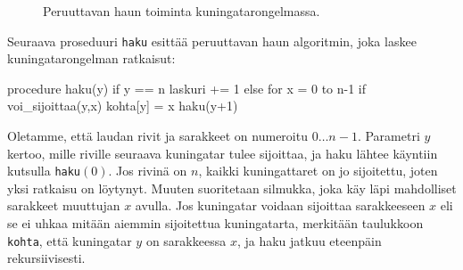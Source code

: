 \begin{figure}
\center
{}
\caption{Peruuttavan haun toiminta kuningatarongelmassa.}
\label{fig:hakupuu}
\end{figure}


Seuraava proseduuri \texttt{haku} esittää peruuttavan haun algoritmin,
joka laskee kuningatarongelman ratkaisut:

\begin{code}
procedure haku(y)
    if y == n
        laskuri += 1
    else
        for x = 0 to n-1
            if voi_sijoittaa(y,x)
                kohta[y] = x
                haku(y+1)
\end{code}

Oletamme, että laudan rivit ja sarakkeet on numeroitu $0 \dots n-1$.
Parametri $y$ kertoo, mille riville seuraava kuningatar tulee sijoittaa,
ja haku lähtee käyntiin kutsulla \texttt{haku}$(0)$.
Jos rivinä on $n$, kaikki kuningattaret on jo sijoitettu,
joten yksi ratkaisu on löytynyt.
Muuten suoritetaan silmukka, joka käy läpi mahdolliset sarakkeet
muuttujan $x$ avulla.
Jos kuningatar voidaan sijoittaa sarakkeeseen $x$
eli se ei uhkaa mitään aiemmin sijoitettua kuningatarta,
merkitään taulukkoon \texttt{kohta},
että kuningatar $y$ on sarakkeessa $x$,
ja haku jatkuu eteenpäin rekursiivisesti.

